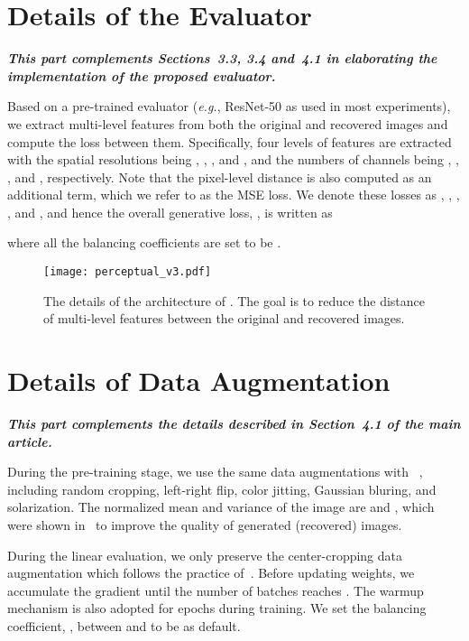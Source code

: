 \documentclass[10pt,twocolumn,letterpaper]{article}
\begin{document}
{\small


}

\newpage
\appendix

\section{Details of the Evaluator}

\textbf{\textit{This part complements Sections~3.3, 3.4 and~4.1 in elaborating the implementation of the proposed evaluator.}}

Based on a pre-trained evaluator (\textit{e.g.}, ResNet-50 as used in most experiments), we extract multi-level features from both the original and recovered images and compute the  loss between them. Specifically, four levels of features are extracted with the spatial resolutions being , , , and , and the numbers of channels being , , , and , respectively. Note that the pixel-level  distance is also computed as an additional term, which we refer to as the MSE loss. We denote these losses as , , , , and , and hence the overall generative loss, , is written as

where all the balancing coefficients are set to be .



\setcounter{figure}{3}
\begin{figure}
\centering
\texttt{[image: perceptual\_v3.pdf]}
\caption{The details of the architecture of . The goal is to reduce the distance of multi-level features between the original and recovered images.}
\label{fig:perceptual}
\end{figure}

\section{Details of Data Augmentation}

\textbf{\textit{This part complements the details described in Section~4.1 of the main article.}}

During the pre-training stage, we use the same data augmentations with ~\cite{grill2020bootstrap}, including random cropping, left-right flip, color jitting, Gaussian bluring, and solarization. The normalized mean and variance of the image are  and , which were shown in~\cite{inpainting} to improve the quality of generated (recovered) images.

During the linear evaluation, we only preserve the center-cropping data augmentation which follows the practice of~\cite{chen2020simple}. Before updating weights, we accumulate the gradient until the number of batches reaches . The warmup mechanism is also adopted for  epochs during training. We set the balancing coefficient, , between  and  to be  as default.
\end{document}
